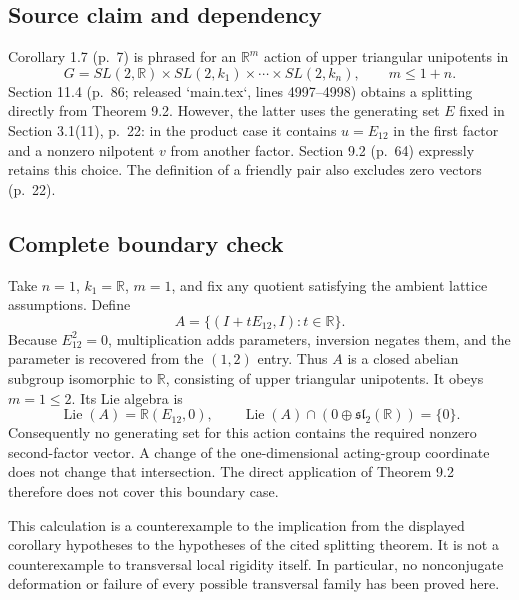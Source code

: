 \documentclass[10pt]{article}
\begin{document}
\subsection*{Source claim and dependency}
Corollary 1.7 (p. 7) is phrased for an \(\mathbb R^m\) action of upper triangular unipotents in \[G=SL(2,\mathbb R)\times SL(2,k_1)\times\cdots\times SL(2,k_n),
\qquad m\leq 1+n .\] Section 11.4 (p. 86; released `main.tex`, lines 4997–4998) obtains a splitting directly from Theorem 9.2. However, the latter uses the generating set \(E\) fixed in Section 3.1(11), p. 22: in the product case it contains \(u=E_{12}\) in the first factor and a nonzero nilpotent \(v\) from another factor. Section 9.2 (p. 64) expressly retains this choice. The definition of a friendly pair also excludes zero vectors (p. 22).\par
\subsection*{Complete boundary check}
Take \(n=1\), \(k_1=\mathbb R\), \(m=1\), and fix any quotient satisfying the ambient lattice assumptions. Define \[A=\{(I+tE_{12},I):t\in\mathbb R\}.\] Because \(E_{12}^2=0\), multiplication adds parameters, inversion negates them, and the parameter is recovered from the \((1,2)\) entry. Thus \(A\) is a closed abelian subgroup isomorphic to \(\mathbb R\), consisting of upper triangular unipotents. It obeys \(m=1\leq2\). Its Lie algebra is \[\mathop{\mathrm{Lie}}(A)=\mathbb R(E_{12},0),\qquad
\mathop{\mathrm{Lie}}(A)\cap(0\oplus\mathfrak{sl}_2(\mathbb R))=\{0\}.\] Consequently no generating set for this action contains the required nonzero second-factor vector. A change of the one-dimensional acting-group coordinate does not change that intersection. The direct application of Theorem 9.2 therefore does not cover this boundary case.\par
This calculation is a counterexample to the implication from the displayed corollary hypotheses to the hypotheses of the cited splitting theorem. It is not a counterexample to transversal local rigidity itself. In particular, no nonconjugate deformation or failure of every possible transversal family has been proved here.\par
\end{document}
